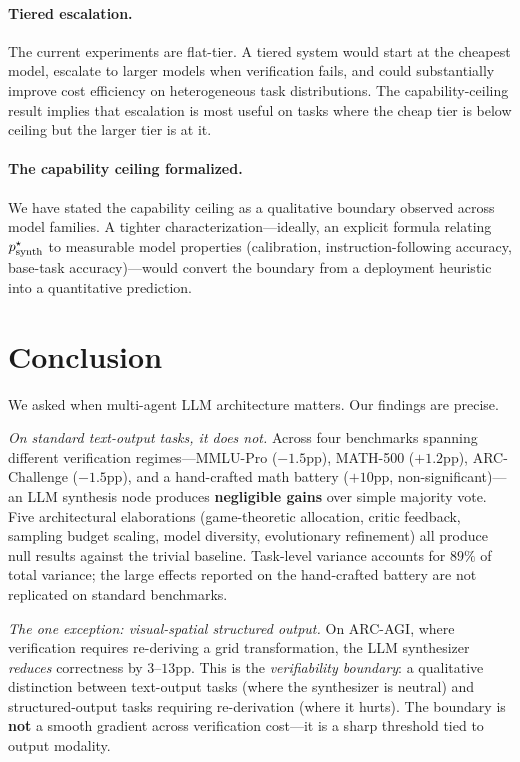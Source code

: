 \documentclass[11pt]{amsart}
\newcommand\1{{\mathds{1}}}
\theoremstyle{definition}
\theoremstyle{remark}
\numberwithin{equation}{section}
\begin{document}
\paragraph{Tiered escalation.}
The current experiments are flat-tier.
A tiered system would start at the cheapest model, escalate to larger models when verification fails, and could substantially improve cost efficiency on heterogeneous task distributions.
The capability-ceiling result implies that escalation is most useful on tasks where the cheap tier is below ceiling but the larger tier is at it.

\paragraph{The capability ceiling formalized.}
We have stated the capability ceiling as a qualitative boundary observed across model families.
A tighter characterization---ideally, an explicit formula relating $p_{\rm synth}^\star$ to measurable model properties (calibration, instruction-following accuracy, base-task accuracy)---would convert the boundary from a deployment heuristic into a quantitative prediction.

\section{Conclusion}\label{sec:conclusion}

We asked when multi-agent LLM architecture matters.
Our findings are precise.

\emph{On standard text-output tasks, it does not.}
Across four benchmarks spanning different verification regimes---MMLU-Pro ($-1.5$pp), MATH-500 ($+1.2$pp), ARC-Challenge ($-1.5$pp), and a hand-crafted math battery ($+10$pp, non-significant)---an LLM synthesis node produces \textbf{negligible gains} over simple majority vote.
Five architectural elaborations (game-theoretic allocation, critic feedback, sampling budget scaling, model diversity, evolutionary refinement) all produce null results against the trivial baseline.
Task-level variance accounts for $89\%$ of total variance; the large effects reported on the hand-crafted battery are not replicated on standard benchmarks.

\emph{The one exception: visual-spatial structured output.}
On ARC-AGI, where verification requires re-deriving a grid transformation, the LLM synthesizer \emph{reduces} correctness by $3$--$13$pp.
This is the \emph{verifiability boundary}: a qualitative distinction between text-output tasks (where the synthesizer is neutral) and structured-output tasks requiring re-derivation (where it hurts).
The boundary is \textbf{not} a smooth gradient across verification cost---it is a sharp threshold tied to output modality.
\end{document}
